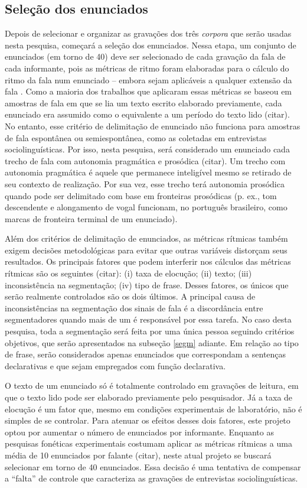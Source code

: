 \documentclass[
		a4paper,	%
		12pt,		%
		]{article}	%
\begin{document}
	\subsection{Seleção dos enunciados} \label{selecao}

	Depois de selecionar e organizar as gravações dos três \emph{corpora} que
	serão usadas nesta pesquisa, começará a seleção dos enunciados. Nessa etapa,
	um conjunto de enunciados (em torno de 40) deve ser selecionado de cada
	gravação da fala de cada informante, pois as métricas de ritmo foram
	elaboradas para o cálculo do ritmo da fala num enunciado -- embora sejam
	aplicáveis a qualquer extensão da fala \citep{Fuchs2016}. Como a
	maioria dos trabalhos que aplicaram essas métricas se baseou em amostras de
	fala em que se lia um texto escrito elaborado previamente, cada enunciado
	era assumido como o equivalente a um período do texto lido (citar). No entanto, esse
	critério de delimitação de enunciado não funciona para amostras de fala
	espontânea ou semiespontânea, como as coletadas em entrevistas
	sociolinguísticas. Por isso, nesta pesquisa, será considerado um enunciado
	cada trecho de fala com autonomia pragmática e prosódica (citar). Um trecho com
	autonomia pragmática é aquele que permanece inteligível mesmo se retirado de
	seu contexto de realização. Por sua vez, esse trecho terá autonomia
	prosódica quando pode ser delimitado com base em fronteiras prosódicas (p.
	ex., tom descendente e alongamento de vogal funcionam, no português
	brasileiro, como marcas de fronteira terminal de um enunciado). 

	Além dos critérios de delimitação de enunciados, as métricas rítmicas também
	exigem decisões metodológicas para evitar que outras variáveis distorçam
	seus resultados. Os principais fatores que podem interferir nos cálculos das
	métricas rítmicas são os seguintes (citar): (i) taxa de elocução; (ii)
	texto; (iii)  inconsistência na segmentação; (iv) tipo de frase. Desses
	fatores, os únicos que serão realmente controlados são os dois últimos. A
	principal causa de inconsistências na segmentação dos sinais de fala é a
	discordância entre segmentadores quando mais de um é responsável por essa
	tarefa. No caso desta pesquisa, toda a segmentação será feita por uma única
	pessoa seguindo critérios objetivos, que serão apresentados na subseção
	\ref{segm} adiante. Em relação ao tipo de frase, serão considerados apenas
	enunciados que correspondam a sentenças declarativas e que sejam empregados
	com função declarativa.

	O texto de um enunciado só é totalmente controlado em gravações de leitura,
	em que o texto lido pode ser elaborado previamente pelo pesquisador. Já a
	taxa de elocução é um fator que, mesmo em condições experimentais de
	laboratório, não é simples de se controlar. Para atenuar os efeitos desses
	dois fatores, este projeto optou por aumentar o número de
	enunciados por informante. Enquanto as pesquisas fonéticas experimentais
	costumam aplicar as métricas rítmicas a uma média de 10 enunciados por
	falante (citar), neste atual projeto se buscará selecionar em torno de 40
	enunciados. Essa decisão é uma tentativa de compensar a \enquote{falta} de
	controle que caracteriza as gravações de entrevistas sociolinguísticas.
\end{document}
